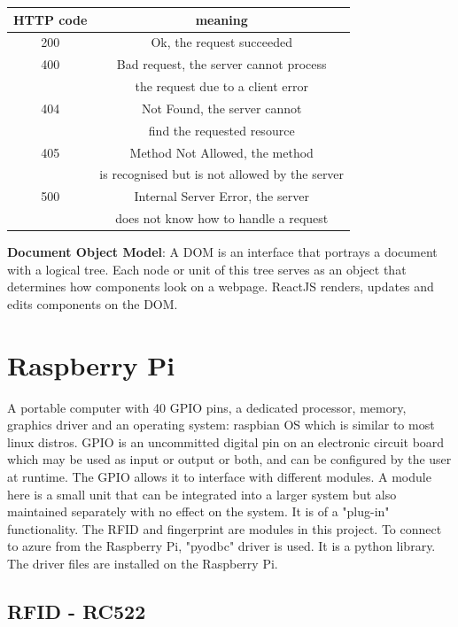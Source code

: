 \begin{center}
\begin{tabular}{|c|  c   |}
  \hline
  \textbf{HTTP code} & meaning\\
  \hline
  200 & Ok, the request succeeded\\
  \hline
  400 & Bad request, the server cannot process\\
  &the request due to a client error\\
  \hline
  404 & Not Found, the server cannot\\
  &find the requested resource\\
  \hline
  405 & Method Not Allowed, the method\\
  &is recognised but is not allowed by the server\\
  \hline
  500 & Internal Server Error, the server\\
   &does not know how to handle a request\\
  \hline
\end{tabular}
\end{center}
 
\textbf{Document Object Model}: A \gls{DOM} is an interface that portrays a document with a logical tree. Each node or unit of this tree serves as an object that determines how components look on a webpage\cite{Introduc41:online}. ReactJS renders, updates and edits components on the \gls{DOM}.
 
\section{Raspberry Pi}
A portable computer with 40 \gls{GPIO} pins, a dedicated processor, memory, graphics driver and an operating system: raspbian OS which is similar to most linux distros.\cite{Arduinov52:online}
\gls{GPIO} is an uncommitted digital pin on an electronic circuit board which may be used as input or output or both, and can be configured by the user at runtime.\cite{Generalp11:online} The \gls{GPIO} allows it to interface with different modules. A module here is a small unit that can be integrated into a larger system but also maintained separately with no effect on the system. It is of a "plug-in" functionality. The \gls{RFID} and fingerprint are modules in this project.
To connect to azure from the Raspberry Pi, "pyodbc" driver is used. It is a python library. The driver files are installed on the Raspberry Pi. 
 
\subsection{RFID - RC522}
